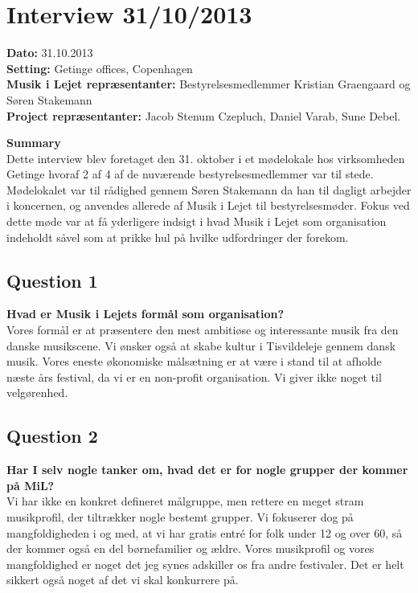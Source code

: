 \section{Interview 31/10/2013}

\textbf{Dato:} 31.10.2013 \\
\textbf{Setting:} Getinge offices, Copenhagen \\
\textbf{Musik i Lejet repræsentanter:} Bestyrelsesmedlemmer Kristian Graengaard og Søren Stakemann \\
\textbf{Project repræsentanter:} Jacob Stenum Czepluch, Daniel Varab, Sune Debel.

\bigskip

\noindent \textbf{Summary} \\
Dette interview blev foretaget den 31. oktober i et mødelokale hos virksomheden Getinge hvoraf 2 af 4 af de nuværende bestyrelsesmedlemmer var til stede. Mødelokalet var til rådighed gennem Søren Stakemann da han til dagligt arbejder i koncernen, og anvendes allerede af Musik i Lejet til bestyrelsesmøder. Fokus ved dette møde var at få yderligere indsigt i hvad Musik i Lejet som organisation indeholdt såvel som at prikke hul på hvilke udfordringer der forekom.


\subsection{Question 1}
\noindent \textbf{Hvad er Musik i Lejets formål som organisation?} \\
Vores formål er at præsentere den mest ambitiøse og interessante musik fra den danske musikscene. Vi ønsker også at skabe kultur i Tisvildeleje gennem dansk musik. Vores eneste økonomiske målsætning er at være i stand til at afholde næste års festival, da vi er en non-profit organisation. Vi giver ikke noget til velgørenhed. 

\subsection{Question 2}
\noindent \textbf{Har I selv nogle tanker om, hvad det er for nogle grupper der kommer på MiL?} \\
Vi har ikke en konkret defineret målgruppe, men rettere en  meget stram musikprofil, der tiltrækker nogle bestemt grupper. Vi fokuserer dog på mangfoldigheden i og med, at vi har gratis entré for folk under 12 og over 60, så der kommer også en del børnefamilier og ældre. Vores musikprofil og vores mangfoldighed er noget det jeg synes adskiller os fra andre festivaler. Det er helt sikkert også noget af det vi skal konkurrere på.

